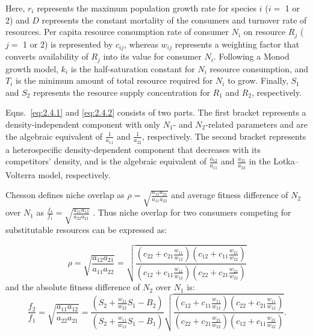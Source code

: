 \begin{tcolorbox}[breakable, leftright skip=-0.5cm]
\noindent Here, $r_{i}$ represents the maximum population growth rate for species $i$ ($i = $ 1 or 2) and $D$ represents the constant mortality of the consumers and turnover rate of resources. Per capita resource consumption rate of consumer $N_{i}$ on resource $R_{j}$ ($j = $ 1 or 2) is represented by $c_{ij}$, whereas $w_{ij}$ represents a weighting factor that converts availability of $R_{j}$ into its value for consumer $N_{i}$. Following a Monod growth model, $k_{i}$ is the half-saturation constant for $N_{i}$ resource consumption, and $T_{i}$ is the minimum amount of total resource required for $N_{i}$ to grow. Finally, $S_{1}$ and $S_{2}$ represents the resource supply concentration for $R_{1}$ and $R_{2}$, respectively.
\par


Eqns.~\ref{eq:2.4.1} and \ref{eq:2.4.2} consists of two parts. The first bracket represents a density-independent component with only $N_{1}$- and $N_{2}$-related parameters and are the algebraic equivalent of $\frac{1}{a_{11}}$ and $\frac{1}{a_{22}}$, respectively. The second bracket represents a heterospecific density-dependent component that decreases with its competitors' density, and is the algebraic equivalent of $\frac{a_{12}}{a_{11}}$ and $\frac{a_{21}}{a_{22}}$ in the Lotka--Volterra model, respectively.
\par


Chesson defines niche overlap as $\rho=\sqrt {\frac{{{a_{12}}{a_{21}}}}{{{a_{11}}{a_{22}}}}}$ and average fitness difference of $N_{2}$ over $N_{1}$ as $\frac{{{f_2}}}{{{f_1}}} = \sqrt {\frac{{{a_{11}}{a_{12}}}}{{{a_{22}}{a_{21}}}}}$ \citep{Chesson2008b, Chesson2013ecosys}. Thus niche overlap for two consumers competing for substitutable resources can be expressed as:

\begin{equation}
\rho  = \sqrt {\frac{{{a_{12}}{a_{21}}}}{{{a_{11}}{a_{22}}}}}  = \sqrt {\frac{\left (
		c_{22} + c_{21}\frac{w_{11}}{w_{12}}\right )\left ( 
		c_{12} + c_{11}\frac{w_{21}}{w_{22}} \right )}{\left (
		c_{12} + c_{11}\frac{w_{11}}{w_{12}}\right )\left ( 
		c_{22} + c_{21}\frac{w_{21}}{w_{22}} \right )}} 
\tag{2.5.1}\label{eq:2.5.1}
\end{equation}
and the absolute fitness difference of $N_{2}$ over $N_{1}$ is:
\begin{equation}
\frac{{{f_2}}}{{{f_1}}} = \sqrt {\frac{{{a_{11}}{a_{12}}}}{{{a_{22}}{a_{21}}}}}  = \frac{\left (S_{2}+\frac{w_{21}}{w_{22}}S_{1}-B_{2}\right )}{\left (S_{2}+\frac{w_{11}}{w_{12}}S_{1}-B_{1}\right )}\sqrt {\frac{\left (
		c_{12} + c_{11}\frac{w_{11}}{w_{12}}\right )\left ( 
		c_{22} + c_{21}\frac{w_{11}}{w_{12}} \right )}{\left (
		c_{22} + c_{21}\frac{w_{21}}{w_{22}}\right )\left ( 
		c_{12} + c_{11}\frac{w_{21}}{w_{22}} \right )}}.
\tag{2.5.2}\label{eq:2.5.2}
\end{equation}
\end{tcolorbox}



